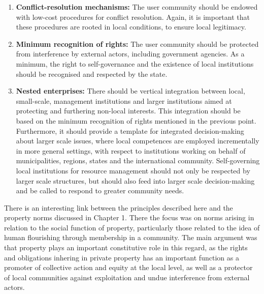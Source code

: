 \begin{enumerate}
\item {\bf Conflict-resolution mechanisms:} The user community should be endowed with low-cost procedures for conflict resolution. Again, it is important that these procedures are rooted in local conditions, to ensure local legitimacy.
\item {\bf Minimum recognition of rights:} The user community should be protected from interference by external actors, including government agencies. As a minimum, the right to self-governance and the existence of local institutions should be recognised and respected by the state.
\item {\bf Nested enterprises:} There should be vertical integration between local, small-scale, management institutions and larger institutions aimed at protecting and furthering non-local interests. This integration should be based on the minimum recognition of rights mentioned in the previous point. Furthermore, it should provide a template for integrated decision-making about larger scale issues, where local competences are employed incrementally in more general settings, with respect to institutions working on behalf of municipalities, regions, states and the international community. Self-governing local institutions for resource management should not only be respected by larger scale structures, but should also feed into larger scale decision-making and be called to respond to greater community needs.
\end{enumerate}

There is an interesting link between the principles described here and the property norms discussed in Chapter 1. There the focus was on norms arising in relation to the social function of property, particularly those related to the idea of human flourishing through membership in a community. The main argument was that property plays an important constitutive role in this regard, as the rights and obligations inhering in private property has an important function as a promoter of collective action and equity at the local level, as well as a protector of local communities against exploitation and undue interference from external actors.

